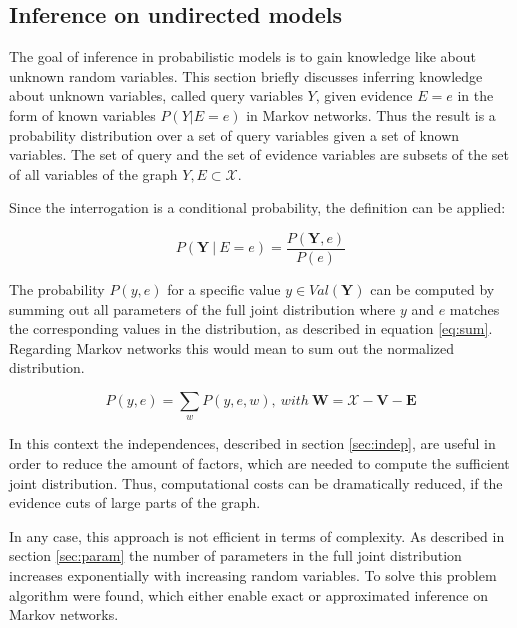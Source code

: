 \subsection{Inference on undirected models} \label{sec:infer}

The goal of inference in probabilistic models is to gain knowledge like about unknown random variables. This section briefly discusses inferring knowledge about unknown variables, called query variables $Y$, given evidence $E=e$ in the form of known variables $P(Y|E=e)$ in Markov networks. Thus the result is a probability distribution over a set of query variables given a set of known variables. The set of query and the set of evidence variables are subsets of the set of all variables of the graph $Y,E \subset \mathcal{X}$.

Since the interrogation is a conditional probability, the definition can be applied:

\begin{equation}
P(\mathbf{Y}\ |\ E=e)=\frac{P(\mathbf{Y},e)}{P(e)}
\end{equation}

The probability $P(y,e)$ for a specific value $y \in Val(\mathbf{Y})$ can be computed by summing out all parameters of the full joint distribution where $y$ and $e$ matches the corresponding values in the distribution, as described in equation \ref{eq:sum}. Regarding Markov networks this would mean to sum out the normalized distribution.

\begin{equation}
P(y,e)=\sum_w{P(y,e,w)},\ with\ \mathbf{W} = \mathcal{X} - \mathbf{V} - \mathbf{E}
\label{eq:sum}
\end{equation}

In this context the independences, described in section \ref{sec:indep}, are useful in order to reduce the amount of factors, which are needed to compute the sufficient joint distribution. Thus, computational costs can be dramatically reduced, if the evidence cuts of large parts of the graph.

In any case, this approach is not efficient in terms of complexity. As described in section \ref{sec:param} the number of parameters in the full joint distribution increases exponentially with increasing random variables. To solve this problem algorithm were found, which either enable exact or approximated inference on Markov networks.

